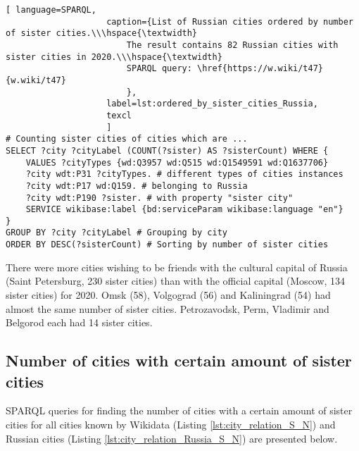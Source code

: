 \begin{lstlisting}[ language=SPARQL, 
                    caption={List of Russian cities ordered by number of sister cities.\\\hspace{\textwidth}
                        The result contains 82 Russian cities with sister cities in 2020.\\\hspace{\textwidth}
                        SPARQL query: \href{https://w.wiki/t47}{w.wiki/t47}
                        },
                    label=lst:ordered_by_sister_cities_Russia,
                    texcl 
                    ]
# Counting sister cities of cities which are ...
SELECT ?city ?cityLabel (COUNT(?sister) AS ?sisterCount) WHERE {           
	VALUES ?cityTypes {wd:Q3957 wd:Q515 wd:Q1549591 wd:Q1637706}
	?city wdt:P31 ?cityTypes. # different types of cities instances
	?city wdt:P17 wd:Q159. # belonging to Russia
	?city wdt:P190 ?sister. # with property "sister city"
	SERVICE wikibase:label {bd:serviceParam wikibase:language "en"}
}
GROUP BY ?city ?cityLabel # Grouping by city
ORDER BY DESC(?sisterCount) # Sorting by number of sister cities
\end{lstlisting}%

There were more cities wishing to be friends with the cultural capital of Russia (Saint Petersburg, 230 sister cities) than with the official capital (Moscow, 134 sister cities) for 2020. Omsk (58), Volgograd (56) and Kaliningrad (54) had almost the same number of sister cities. Petrozavodsk, Perm, Vladimir and Belgorod each had 14 sister cities.

\subsection{Number of cities with certain amount of sister cities}

SPARQL queries for finding the number of cities with a certain amount of sister cities for all cities known by Wikidata (Listing \ref{lst:city_relation_S_N}) and Russian cities (Listing \ref{lst:city_relation_Russia_S_N}) are presented below.

